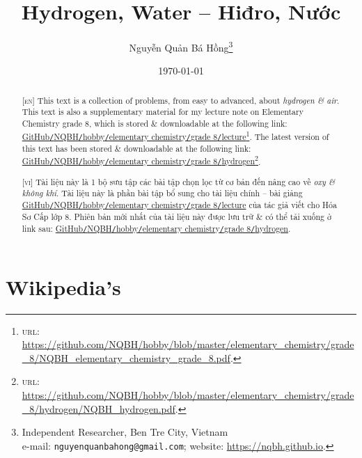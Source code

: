 \documentclass{article}
\title{Hydrogen, Water -- Hiđro, Nước}
\author{Nguyễn Quản Bá Hồng\footnote{Independent Researcher, Ben Tre City, Vietnam\\e-mail: \texttt{nguyenquanbahong@gmail.com}; website: \url{https://nqbh.github.io}.}}
\date{\today}
\begin{document}
\maketitle
\begin{abstract}
	\textsc{[en]} This text is a collection of problems, from easy to advanced, about \textit{hydrogen \& air}. This text is also a supplementary material for my lecture note on Elementary Chemistry grade 8, which is stored \& downloadable at the following link: \href{https://github.com/NQBH/hobby/blob/master/elementary_chemistry/grade_8/NQBH_elementary_chemistry_grade_8.pdf}{GitHub\texttt{/}NQBH\texttt{/}hobby\texttt{/}elementary chemistry\texttt{/}grade 8\texttt{/}lecture}\footnote{\textsc{url}: \url{https://github.com/NQBH/hobby/blob/master/elementary_chemistry/grade_8/NQBH_elementary_chemistry_grade_8.pdf}.}. The latest version of this text has been stored \& downloadable at the following link: \href{https://github.com/NQBH/hobby/blob/master/elementary_chemistry/grade_8/hydrogen/NQBH_hydrogen.pdf}{GitHub\texttt{/}NQBH\texttt{/}hobby\texttt{/}elementary chemistry\texttt{/}grade 8\texttt{/}hydrogen}\footnote{\textsc{url}: \url{https://github.com/NQBH/hobby/blob/master/elementary_chemistry/grade_8/hydrogen/NQBH_hydrogen.pdf}.}.
	\vspace{2mm}
	
	\textsc{[vi]} Tài liệu này là 1 bộ sưu tập các bài tập chọn lọc từ cơ bản đến nâng cao về \textit{oxy \& không khí}. Tài liệu này là phần bài tập bổ sung cho tài liệu chính -- bài giảng \href{https://github.com/NQBH/hobby/blob/master/elementary_chemistry/grade_8/NQBH_elementary_chemistry_grade_8.pdf}{GitHub\texttt{/}NQBH\texttt{/}hobby\texttt{/}elementary chemistry\texttt{/}grade 8\texttt{/}lecture} của tác giả viết cho Hóa Sơ Cấp lớp 8. Phiên bản mới nhất của tài liệu này được lưu trữ \& có thể tải xuống ở link sau: \href{https://github.com/NQBH/hobby/blob/master/elementary_chemistry/grade_8/hydrogen/NQBH_hydrogen.pdf}{GitHub\texttt{/}NQBH\texttt{/}hobby\texttt{/}elementary chemistry\texttt{/}grade 8\texttt{/}hydrogen}.
\end{abstract}
\tableofcontents
\newpage


\section{Wikipedia's}
\end{document}
